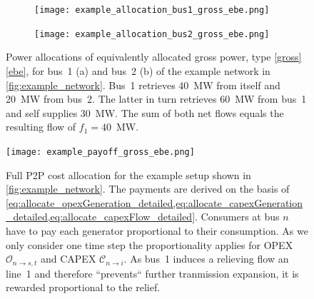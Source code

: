 \documentclass[11pt,twocolumn]{article}
\newcommand{\allocateopex}[1][n \rightarrow s]{\mathcal{O}_{#1,t}}
\begin{document}
% 
\begin{figure}[h!]
    \begin{subfigure}[c]{.495\linewidth}
    \texttt{[image: example\_allocation\_bus1\_gross\_ebe.png]}
    \vspace{-40pt}
    \subcaption{}
    \label{fig:example_allocation_bus1}
    \end{subfigure}
    \begin{subfigure}[c]{.495\linewidth}
    \texttt{[image: example\_allocation\_bus2\_gross\_ebe.png]}
    \vspace{-40pt}
    \subcaption{}
    \label{fig:example_allocation_bus2_gross_ebe}
    \end{subfigure}
    \caption{Power allocations of equivalently allocated gross power, type \ref{gross}\ref{ebe}, for bus~1 (a) and bus~2 (b) of the example network in \cref{fig:example_network}. Bus~1 retrieves 40~MW from itself and 20~MW from bus~2. The latter in turn retrieves 60~MW from bus~1 and self supplies 30~MW.
    The sum of both net flows equals the resulting flow of $f_1=40$~MW. \vspace{-0pt}}
    \label{fig:example_allocation}
\end{figure}
% 
% 
\begin{figure}[h]
    \centering
    \texttt{[image: example\_payoff\_gross\_ebe.png]}
    \caption{Full P2P cost allocation for the example setup shown in \cref{fig:example_network}. The payments are derived on the basis of \cref{eq:allocate_opexGeneration_detailed,eq:allocate_capexGeneration_detailed,eq:allocate_capexFlow_detailed}. Consumers at bus $n$ have to pay each generator proportional to their consumption. As we only consider one time step the proportionality applies for OPEX $\allocateopex$ and CAPEX $\mathcal{C}_{n \rightarrow i}$. As bus~1 induces a relieving flow an line~1 and therefore ``prevents`` further tranmission expansion, it is rewarded proportional to the relief.}
    \label{fig:example_payoff}
\end{figure}    
% 
% 
% 
\end{document}
